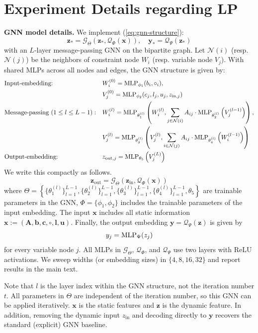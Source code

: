 \documentclass{amsart} %
\def\eqref#1{equation~\ref{#1}}
\def\vb{{\bm{b}}}
\def\vc{{\bm{c}}}
\def\vl{{\bm{l}}}
\def\vu{{\bm{u}}}
\def\vx{{\bm{x}}}
\def\vy{{\bm{y}}}
\def\vz{{\bm{z}}}
\def\mA{{\bm{A}}}
\def\cG{{\mathcal{G}}}
\def\cN{{\mathcal{N}}}
\def\cQ{{\mathcal{Q}}}
\theoremstyle{definition}
\theoremstyle{remark}
\renewcommand{\eqref}[1]{\textup{(\ref{#1})}}
\begin{document}
\section{Experiment Details regarding LP}
\label{sec:app-lp-exp}

\textbf{GNN model details.}
We implement \eqref{eq:gnn-structure}:
\[\vz_\ast = \cG_{\Theta}(\vz_\ast,\cQ_{\Phi}(\vx)), \quad \vy_\ast = \cQ_{\Psi}(\vz_\ast) \]
with an $L$-layer message-passing GNN \cite{scarselli2008graph,xu2018how} on the bipartite graph. Let $\cN(i)$ (resp. $\cN(j)$) be the neighbors of constraint node $W_i$ (resp. variable node $V_j$). With shared MLPs across all nodes and edges, the GNN structure is given by:
\begin{align*}
& \textup{Input-embedding: } &&  W_i^{(0)} = \textup{MLP}_{\phi_1}(b_i,\circ_i), \\
& && V_j^{(0)} = \textup{MLP}_{\phi_2}(c_j,l_j, u_j, z_{\mathrm{in},j}) \\ 
& \textup{Message-passing }(1\leq l \leq L-1): && W_i^{(l)} = \textup{MLP}_{\theta_1^{(l)}}\left( W_i^{(l)}, \sum_{j \in \cN(i)} A_{ij} \cdot \textup{MLP}_{\theta_2^{(l)}}\left( V_j^{(l-1)}\right) \right), \\
& && V_j^{(l)} = \textup{MLP}_{\theta_3^{(l)}}\left( V_j^{(l)}, \sum_{i \in \cN(j)} A_{ij} \cdot \textup{MLP}_{\theta_4^{(l)}}\left( W_i^{(l-1)}\right) \right) \\
& \textup{Output-embedding: } && z_{\mathrm{out},j} = \textup{MLP}_{\theta_5}\left( V_j^{(L)} \right)
\end{align*}
We write this compactly as follows.
\[ \vz_{\mathrm{out}} = \cG_{\Theta}(\vz_{\mathrm{in}},\cQ_{\Phi}(\vx)) \]
where $\Theta = \left\{ \{\theta_1^{(l)}\}_{l=1}^{L-1},\{\theta_2^{(l)}\}_{l=1}^{L-1},\{\theta_3^{(l)}\}_{l=1}^{L-1},\{\theta_4^{(l)}\}_{l=1}^{L-1}, \theta_5 \right\}$ are trainable parameters in the GNN, $\Phi = \{\phi_1,\phi_2\}$ includes the trainable parameters of the input embedding. The input $\vx$ includes all static information $\vx := (\mA,\vb,\vc,\circ,\vl,\vu)$. Finally, the output embedding $\vy = \cQ_{\Psi}(\vz)$ is given by
\[ y_j = \textup{MLP}_{\Psi}(z_j) \]
for every variable node $j$. All MLPs in $\cG_{\Theta}$, $\cQ_{\Phi}$, and $\cQ_{\Psi}$ use two layers with ReLU activations. We sweep widths (or embedding sizes) in $\{4,8,16,32\}$ and report results in the main text.

Note that $l$ is the layer index within the GNN structure, not the iteration number $t$. All parameters in $\Theta$ are independent of the iteration number, so this GNN can be applied iteratively. $\vx$ is the static features and $\vz$ is the dynamic feature.
In addition, removing the dynamic input $z_{\mathrm{in}}$ and decoding directly to $\vy$ recovers the standard (explicit) GNN baseline.
\end{document}
